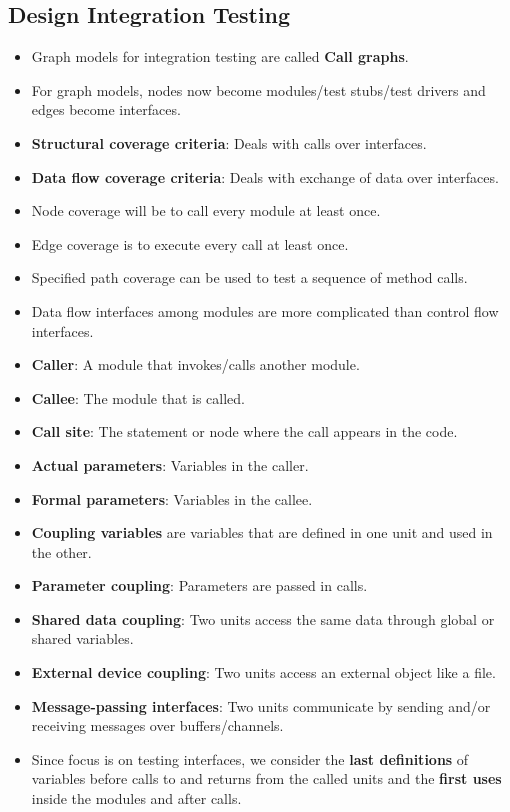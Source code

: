 \documentclass[a4paper]{article}
\begin{document}
\subsection{Design Integration Testing}
\begin{itemize}
    \item Graph models for integration testing are called \textbf{Call graphs}.
    \item For graph models, nodes now become modules/test stubs/test drivers and edges become interfaces.
    \item \textbf{Structural coverage criteria}: Deals with calls over interfaces.
    \item \textbf{Data flow coverage criteria}: Deals with exchange of data over interfaces.
    \item Node coverage will be to call every module at least once.
    \item Edge coverage is to execute every call at least once.
    \item Specified path coverage can be used to test a sequence of method calls.
    \item Data flow interfaces among modules are more complicated than control flow interfaces.
    \item \textbf{Caller}: A module that invokes/calls another module.
    \item \textbf{Callee}: The module that is called.
    \item \textbf{Call site}: The statement or node where the call appears in the code.
    \item \textbf{Actual parameters}: Variables in the caller.
    \item \textbf{Formal parameters}: Variables in the callee.
    \item \textbf{Coupling variables} are variables that are defined in one unit and used in the other.
    \item \textbf{Parameter coupling}: Parameters are passed in calls.
    \item \textbf{Shared data coupling}: Two units access the same data through global or shared variables.
    \item \textbf{External device coupling}: Two units access an external object like a file.
    \item \textbf{Message-passing interfaces}: Two units communicate by sending and/or receiving messages over buffers/channels.
    \item Since focus is on testing interfaces, we consider the \textbf{last definitions} of variables before calls to and returns from the called units and the \textbf{first uses} inside the modules and after calls.

\end{itemize}
\end{document}
